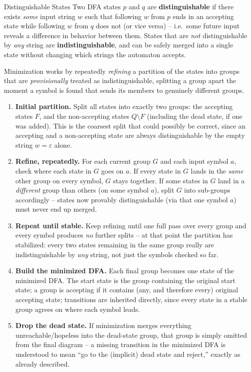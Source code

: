 \documentclass[full-course-notes.tex]{subfiles}
\begin{document}
\begin{defbox}{Distinguishable States}
Two DFA states $p$ and $q$ are \textbf{distinguishable} if there exists \emph{some} input
string $w$ such that following $w$ from $p$ ends in an accepting state while following $w$ from
$q$ does not (or vice versa) -- i.e.\ some future input reveals a difference in behavior between
them. States that are \emph{not} distinguishable by \emph{any} string are
\textbf{indistinguishable}, and can be safely merged into a single state without changing which
strings the automaton accepts.
\end{defbox}

\begin{coreidea}
Minimization works by repeatedly \emph{refining} a partition of the states into groups that are
\emph{provisionally} treated as indistinguishable, splitting a group apart the moment a symbol
is found that sends its members to genuinely different groups.
\begin{enumerate}
  \item \textbf{Initial partition.} Split all states into exactly two groups: the accepting
  states $F$, and the non-accepting states $Q \setminus F$ (including the dead state, if one was
  added). This is the coarsest split that could possibly be correct, since an accepting and a
  non-accepting state are always distinguishable by the empty string $w = \varepsilon$ alone.
  \item \textbf{Refine, repeatedly.} For each current group $G$ and each input symbol $a$, check
  where each state in $G$ goes on $a$. If every state in $G$ lands in the \emph{same} other
  group on every symbol, $G$ stays together. If some states in $G$ land in a \emph{different}
  group than others (on some symbol $a$), split $G$ into sub-groups accordingly -- states now
  provably distinguishable (via that one symbol $a$) must never end up merged.
  \item \textbf{Repeat until stable.} Keep refining until one full pass over every group and
  every symbol produces \emph{no} further splits -- at that point the partition has stabilized:
  every two states remaining in the same group really are indistinguishable by \emph{any}
  string, not just the symbols checked so far.
  \item \textbf{Build the minimized DFA.} Each final group becomes one state of the minimized
  DFA. The start state is the group containing the original start state; a group is accepting
  if it contains (any, and therefore every) original accepting state; transitions are inherited
  directly, since every state in a stable group agrees on where each symbol leads.
  \item \textbf{Drop the dead state.} If minimization merges everything unreachable/hopeless
  into the dead-state group, that group is simply omitted from the final diagram -- a missing
  transition in the minimized DFA is understood to mean ``go to the (implicit) dead state and
  reject,'' exactly as  already described.
\end{enumerate}
\end{coreidea}
\end{document}
